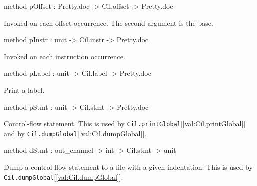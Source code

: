 \documentclass[11pt]{article}
\begin{document}
\begin{ocamldocobjectend}
\begin{ocamldocdescription}
\end{ocamldocdescription}


\label{method:Cil.cilPrinter.pOffset}\begin{ocamldoccode}
method pOffset : Pretty.doc -> Cil.offset -> Pretty.doc
\end{ocamldoccode}
\begin{ocamldocdescription}
Invoked on each offset occurrence. The second argument is the base.


\end{ocamldocdescription}


\label{method:Cil.cilPrinter.pInstr}\begin{ocamldoccode}
method pInstr : unit -> Cil.instr -> Pretty.doc
\end{ocamldoccode}
\begin{ocamldocdescription}
Invoked on each instruction occurrence.


\end{ocamldocdescription}


\label{method:Cil.cilPrinter.pLabel}\begin{ocamldoccode}
method pLabel : unit -> Cil.label -> Pretty.doc
\end{ocamldoccode}
\begin{ocamldocdescription}
Print a label.


\end{ocamldocdescription}


\label{method:Cil.cilPrinter.pStmt}\begin{ocamldoccode}
method pStmt : unit -> Cil.stmt -> Pretty.doc
\end{ocamldoccode}
\begin{ocamldocdescription}
Control-flow statement. This is used by 
 {\tt{Cil.printGlobal}}[\ref{val:Cil.printGlobal}] and by {\tt{Cil.dumpGlobal}}[\ref{val:Cil.dumpGlobal}].


\end{ocamldocdescription}


\label{method:Cil.cilPrinter.dStmt}\begin{ocamldoccode}
method dStmt : out_channel -> int -> Cil.stmt -> unit
\end{ocamldoccode}
\begin{ocamldocdescription}
Dump a control-flow statement to a file with a given indentation. 
 This is used by {\tt{Cil.dumpGlobal}}[\ref{val:Cil.dumpGlobal}].



\end{ocamldocdescription}
\end{ocamldocobjectend}
\end{document}
